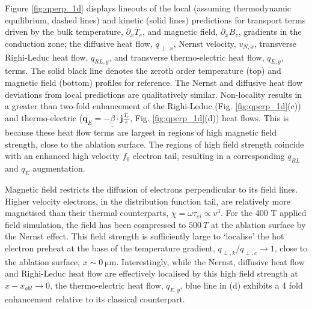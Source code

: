 \documentclass[aip,reprint]{revtex4-1}
\newcommand*{\dbul}[1]{%
	\underline{\underline{ #1}}
}
\begin{document}
 Figure \ref{fig:qperp_1d} displays lineouts  of the local (assuming thermodynamic equilibrium, dashed lines) and kinetic (solid lines) predictions for transport terms driven by the bulk temperature, $\partial_x T_{e}$, and magnetic field, $\partial_x B_{z}$, gradients in the conduction zone; the diffusive heat flow, $q_{\perp,x}$, Nernst velocity, $v_{N,x}$, transverse Righi-Leduc heat flow, $q_{RL,y}$,  and transverse thermo-electric heat flow, $q_{E,y}$, terms. The solid black line denotes the zeroth order temperature (top) and magnetic field (bottom) profiles for reference. The Nernst and diffusive heat flow deviations from local predictions are qualitatively similar. Non-locality results in a greater than two-fold enhancement of the Righi-Leduc (Fig. \ref{fig:qperp_1d}(c)) and thermo-electric ($\mathbf{q}_{E} = -\dbul{\beta} \cdot \mathbf{j} \frac{T_e}{e}$, Fig. \ref{fig:qperp_1d}(d)) heat flows. This is because these heat flow terms are largest in regions of high magnetic field strength, close to the ablation surface. The regions of high field strength coincide with an enhanced high velocity $f_0$ electron tail, resulting in a corresponding $q_{RL}$ and $q_{E}$ augmentation. 

Magnetic field restricts the diffusion of electrons perpendicular to its field lines.   Higher velocity electrons, in the distribution function tail, are relatively more magnetised than their thermal counterparts, $\chi = \omega \tau_{ei} \propto v^3$. For the 400 T applied field simulation, the field has been compressed to $\SI{500}{T}$ at the ablation surface by the Nernst effect. This field strength is sufficiently large to `localise' the hot electron preheat at the base of the temperature gradient, $q_{\perp,k}/q_{\perp,c}\rightarrow 1$, close to the ablation surface, $x \sim \SI{0}{\micro\meter}$.  Interestingly, while the Nernst, diffusive heat flow and Righi-Leduc heat flow are effectively localised by this high field strength at $x-x_{abl} \rightarrow 0$, the thermo-electric heat flow, $q_{E,y}$,  blue line in (d) exhibits a 4 fold enhancement relative to its classical counterpart. 
\end{document}
